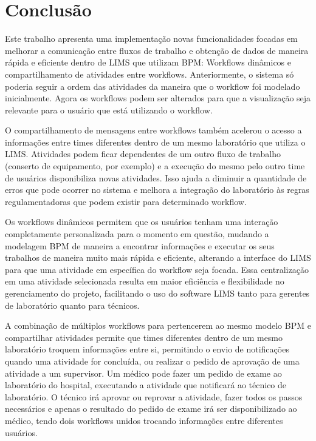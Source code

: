 \section{Conclusão}

Este trabalho apresenta uma implementação novas funcionalidades focadas em melhorar a comunicação entre fluxos de trabalho e obtenção de dados de maneira rápida e eficiente dentro de LIMS que utilizam BPM: Workflows dinâmicos e compartilhamento de atividades entre workflows. Anteriormente, o sistema só poderia seguir a ordem das atividades da maneira que o workflow foi modelado inicialmente. Agora os workflows podem ser alterados para que a visualização seja relevante para o usuário que está utilizando o workflow.

O compartilhamento de mensagens entre workflows também acelerou o acesso a informações entre times diferentes dentro de um mesmo laboratório que utiliza o LIMS. Atividades podem ficar dependentes de um outro fluxo de trabalho (conserto de equipamento, por exemplo) e a execução do mesmo pelo outro time de usuários disponibiliza novas atividades. Isso ajuda a diminuir a quantidade de erros que pode ocorrer no sistema e melhora a integração do laboratório às regras regulamentadoras que podem existir para determinado workflow.

Os workflows dinâmicos permitem que os usuários tenham uma interação completamente personalizada para o momento em questão, mudando a modelagem BPM de maneira a encontrar informações e executar os seus trabalhos de maneira muito mais rápida e eficiente, alterando a interface do LIMS para que uma atividade em específica do workflow seja focada.
Essa centralização em uma atividade selecionada resulta em maior eficiência e flexibilidade no gerenciamento do projeto, facilitando o uso do software LIMS tanto para gerentes de laboratório quanto para técnicos.

A combinação de múltiplos workflows para pertencerem ao mesmo modelo BPM e compartilhar atividades permite que times diferentes dentro de um mesmo laboratório troquem informações entre si, permitindo o envio de notificações quando uma atividade for concluída, ou realizar o pedido de aprovação de uma atividade a um supervisor. Um médico pode fazer um pedido de exame ao laboratório do hospital, executando a atividade que notificará ao técnico de laboratório. O técnico irá aprovar ou reprovar a atividade, fazer todos os passos necessários e apenas o resultado do pedido de exame irá ser disponibilizado ao médico, tendo dois workflows unidos trocando informações entre diferentes usuários.

